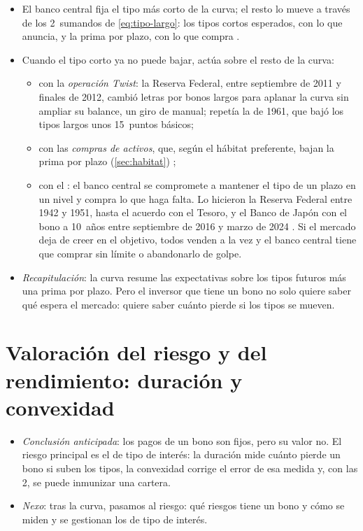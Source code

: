 \documentclass[11pt]{article}
\begin{document}
\begin{itemize}
\item El banco central fija el tipo más corto de la curva; el resto lo mueve a través de los 2~sumandos de \eqref{eq:tipo-largo}: los tipos cortos esperados, con lo que anuncia, y la prima por plazo, con lo que compra .
\item Cuando el tipo corto ya no puede bajar, actúa sobre el resto de la curva:
  \begin{itemize}
  \item con la \emph{operación Twist}: la Reserva Federal, entre septiembre de 2011 y finales de 2012, cambió letras por bonos largos para aplanar la curva sin ampliar su balance\nocite{Fed2011Twist,Fed2012Twist}, un giro de manual; repetía la de 1961, que bajó los tipos largos unos 15~puntos básicos\nocite{Swanson2011Twist};
  \item con las \emph{compras de activos}, que, según el hábitat preferente, bajan la prima por plazo (\ref{sec:habitat}) ;
  \item con el : el banco central se compromete a mantener el tipo de un plazo en un nivel y compra lo que haga falta. Lo hicieron la Reserva Federal entre 1942 y 1951, hasta el acuerdo con el Tesoro\nocite{FedHistory2026Accord}, y el Banco de Japón con el bono a 10~años entre septiembre de 2016 y marzo de 2024\nocite{BoJ2016YCC,BoJ2024Marco} . Si el mercado deja de creer en el objetivo, todos venden a la vez y el banco central tiene que comprar sin límite o abandonarlo de golpe.
  \end{itemize}
\item \emph{Recapitulación}: la curva resume las expectativas sobre los tipos futuros más una prima por plazo. Pero el inversor que tiene un bono no solo quiere saber qué espera el mercado: quiere saber cuánto pierde si los tipos se mueven.
\end{itemize}

\section{Valoración del riesgo y del rendimiento:\cortetitulo{} duración y convexidad}\label{sec:riesgo}

\begin{itemize}
\item \emph{Conclusión anticipada}: los pagos de un bono son fijos, pero su valor no. El riesgo principal es el de tipo de interés: la duración mide cuánto pierde un bono si suben los tipos, la convexidad corrige el error de esa medida y, con las 2, se puede inmunizar una cartera.
\item \emph{Nexo}: tras la curva, pasamos al riesgo: qué riesgos tiene un bono y cómo se miden y se gestionan los de tipo de interés.
\end{itemize}
\end{document}
